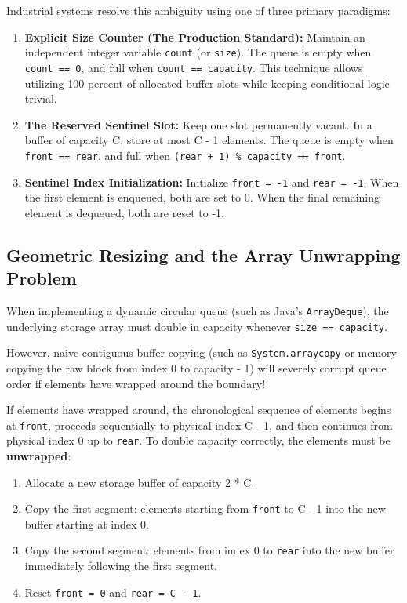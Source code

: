 \documentclass[10pt,journal,compsoc,onecolumn]{IEEEtran}
\begin{document}
Industrial systems resolve this ambiguity using one of three primary paradigms:
\begin{enumerate}
    \item \textbf{Explicit Size Counter (The Production Standard):} Maintain an independent integer variable \texttt{count} (or \texttt{size}). The queue is empty when \texttt{count == 0}, and full when \texttt{count == capacity}. This technique allows utilizing 100 percent of allocated buffer slots while keeping conditional logic trivial.
    \item \textbf{The Reserved Sentinel Slot:} Keep one slot permanently vacant. In a buffer of capacity C, store at most C - 1 elements. The queue is empty when \texttt{front == rear}, and full when \texttt{(rear + 1) \% capacity == front}.
    \item \textbf{Sentinel Index Initialization:} Initialize \texttt{front = -1} and \texttt{rear = -1}. When the first element is enqueued, both are set to 0. When the final remaining element is dequeued, both are reset to -1.
\end{enumerate}

\subsection{Geometric Resizing and the Array Unwrapping Problem}

When implementing a dynamic circular queue (such as Java's \texttt{ArrayDeque}), the underlying storage array must double in capacity whenever \texttt{size == capacity}.

However, naive contiguous buffer copying (such as \texttt{System.arraycopy} or memory copying the raw block from index 0 to capacity - 1) will severely corrupt queue order if elements have wrapped around the boundary!

If elements have wrapped around, the chronological sequence of elements begins at \texttt{front}, proceeds sequentially to physical index C - 1, and then continues from physical index 0 up to \texttt{rear}. To double capacity correctly, the elements must be \textbf{unwrapped}:
\begin{enumerate}
    \item Allocate a new storage buffer of capacity 2 * C.
    \item Copy the first segment: elements starting from \texttt{front} to C - 1 into the new buffer starting at index 0.
    \item Copy the second segment: elements from index 0 to \texttt{rear} into the new buffer immediately following the first segment.
    \item Reset \texttt{front = 0} and \texttt{rear = C - 1}.
\end{enumerate}
\end{document}
